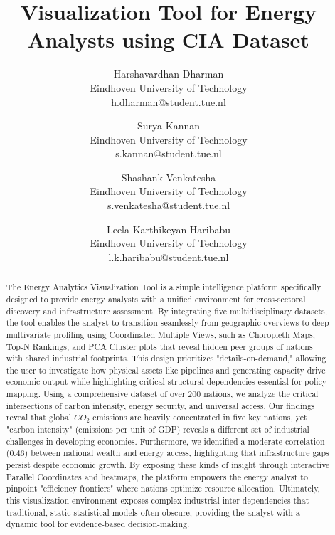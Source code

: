 \documentclass[conference]{IEEEtran}
\begin{document}
\title{Visualization Tool for Energy Analysts using CIA Dataset}
\author{
    Harshavardhan Dharman\\
    \scriptsize Eindhoven University of Technology\\
    \scriptsize h.dharman@student.tue.nl
\and
    Surya Kannan\\
    \scriptsize Eindhoven University of Technology\\
    \scriptsize s.kannan@student.tue.nl
\and
    Shashank Venkatesha\\
    \scriptsize Eindhoven University of Technology\\
    \scriptsize s.venkatesha@student.tue.nl
\and
    Leela Karthikeyan Haribabu\\
    \scriptsize Eindhoven University of Technology\\
    \scriptsize l.k.haribabu@student.tue.nl
}



\maketitle
\textcolor{blue}{
\begin{abstract}
The Energy Analytics Visualization Tool is a simple intelligence platform specifically designed to provide energy analysts with a unified environment for cross-sectoral discovery and infrastructure assessment. By integrating five multidisciplinary datasets, the tool enables the analyst to transition seamlessly from geographic overviews to deep multivariate profiling using Coordinated Multiple Views, such as Choropleth Maps, Top-N Rankings, and PCA Cluster plots that reveal hidden peer groups of nations with shared industrial footprints. This design prioritizes "details-on-demand," allowing the user to investigate how physical assets like pipelines and generating capacity drive economic output while highlighting critical structural dependencies essential for policy mapping. Using a comprehensive dataset of over 200 nations, we analyze the critical intersections of carbon intensity, energy security, and universal access. Our findings reveal that global $CO_{2}$ emissions are heavily concentrated in five key nations, yet "carbon intensity" (emissions per unit of GDP) reveals a different set of industrial challenges in developing economies. Furthermore, we identified a moderate correlation (0.46) between national wealth and energy access, highlighting that infrastructure gaps persist despite economic growth.  By exposing these kinds of insight through interactive Parallel Coordinates and heatmaps, the platform empowers the energy analyst to pinpoint "efficiency frontiers" where nations optimize resource allocation. Ultimately, this visualization environment exposes complex industrial inter-dependencies that traditional, static statistical models often obscure, providing the analyst with a dynamic tool for evidence-based decision-making.
\end{abstract}
}
\end{document}
